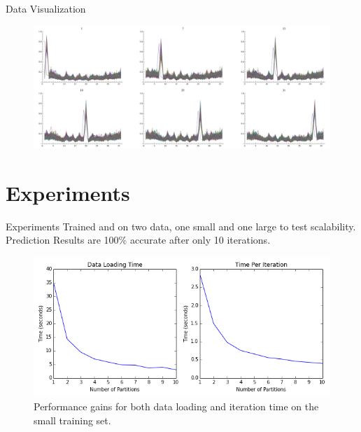 \documentclass{beamer}
\begin{document}
\begin{frame}{Data Visualization}

\begin{figure}[h]
\begin{center}
\includegraphics[scale=0.26]{2d.pdf}
\end{center}
\end{figure}

\end{frame}



\section{Experiments}

\begin{frame}{Experiments}
Trained and on two data, one small and one large to test scalability.  Prediction Results are 100\% accurate after only 10 iterations.

\begin{figure}[h]
\begin{center}
\includegraphics[scale=0.4]{small_metrics.png}
\caption{Performance gains for both data loading and iteration time on the small training set.}
\label{fig:small}
\end{center}
\end{figure}

\end{frame}
\end{document}
